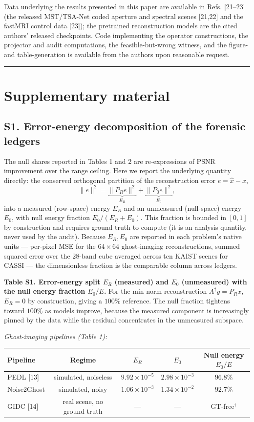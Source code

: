 \documentclass[11pt]{article}
\begin{document}
Data underlying the results presented in this paper are available in Refs. [21--23] (the released MST/TSA-Net coded aperture and spectral scenes [21,22] and the fastMRI control data [23]); the pretrained reconstruction models are the cited authors' released checkpoints. Code implementing the operator constructions, the projector and audit computations, the feasible-but-wrong witness, and the figure- and table-generation is available from the authors upon reasonable request.

\medskip\hrule\medskip

\section*{Supplementary material}

\subsection*{S1. Error-energy decomposition of the forensic ledgers}

The null shares reported in Tables 1 and 2 are re-expressions of PSNR improvement over the range ceiling. Here we report the underlying quantity directly: the conserved orthogonal partition of the reconstruction error $e = \hat{x} - x$,
$$\|e\|^2 = \underbrace{\|P_R e\|^2}_{E_R} + \underbrace{\|P_0 e\|^2}_{E_0},$$
into a measured (row-space) energy $E_R$ and an unmeasured (null-space) energy $E_0$, with null energy fraction $E_0/(E_R+E_0)$. This fraction is bounded in $[0,1]$ by construction and requires ground truth to compute (it is an analysis quantity, never used by the audit). Because $E_R, E_0$ are reported in each problem's native units --- per-pixel MSE for the $64\times64$ ghost-imaging reconstructions, summed squared error over the $28$-band cube averaged across ten KAIST scenes for CASSI --- the dimensionless fraction is the comparable column across ledgers.

\textbf{Table S1. Error-energy split $E_R$ (measured) and $E_0$ (unmeasured) with the null energy fraction $E_0/E$.} For the min-norm reconstruction $A^{\dagger}y = P_R x$, $E_R = 0$ by construction, giving a $100\%$ reference. The null fraction tightens toward $100\%$ as models improve, because the measured component is increasingly pinned by the data while the residual concentrates in the unmeasured subspace.

\textit{Ghost-imaging pipelines (Table 1):}

\begin{center}\begin{tabular}{lcccc}
\toprule
Pipeline & Regime & $E_R$ & $E_0$ & Null energy $E_0/E$ \\
\midrule
PEDL [13] & simulated, noiseless & $9.92\times10^{-5}$ & $2.98\times10^{-3}$ & $96.8\%$ \\
Noise2Ghost & simulated, noisy & $1.06\times10^{-3}$ & $1.34\times10^{-2}$ & $92.7\%$ \\
GIDC [14] & real scene, no ground truth & --- & --- & GT-free$^{\dagger}$ \\
\bottomrule
\end{tabular}\end{center}
\end{document}
